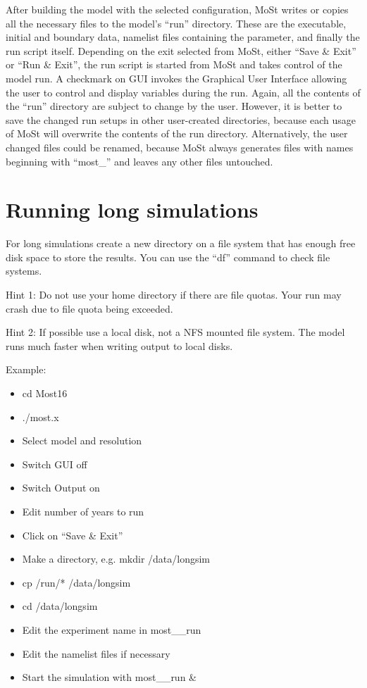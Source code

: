After building the model with the selected configuration,
MoSt writes or copies all the necessary files to the model's
``run'' directory. These are the executable, initial and boundary data,
namelist files containing the parameter, and finally the
run script itself. Depending on the exit selected from MoSt,
either ``Save \& Exit'' or ``Run \& Exit'', the run script is started
from MoSt and takes control of the model run. A checkmark on
GUI invokes the Graphical User Interface allowing the user to control
and display variables during the run.
Again, all the contents of the ``run'' directory are subject to change
by the user. However, it is better to save the changed run setups
in other user-created directories, because each usage of
MoSt will overwrite the contents of the run directory.
Alternatively, the user changed files could be renamed,
because MoSt always generates files with names beginning with ``most\_''
and leaves any other files untouched.

\section{Running long simulations}

For long simulations create a new directory on a file system
that has enough free disk space to store the results.
You can use the ``df'' command to check file systems.

Hint 1: Do not use your home directory if there are file quotas.
Your run may crash due to file quota being exceeded.

Hint 2: If possible use a local disk, not a NFS mounted file system.
The model runs much faster when writing output to local disks.

Example:

\begin{itemize}
\item cd Most16
\item ./most.x
\item Select model and resolution
\item Switch GUI off
\item Switch Output on
\item Edit number of years to run
\item Click on ``Save \& Exit''
\item Make a directory, e.g. mkdir /data/longsim
\item cp {\modir/run/*} /data/longsim
\item cd /data/longsim
\item Edit the experiment name in most\_\modir\_run
\item Edit the namelist files if necessary
\item Start the simulation with most\_\modir\_run \&
\end{itemize}

